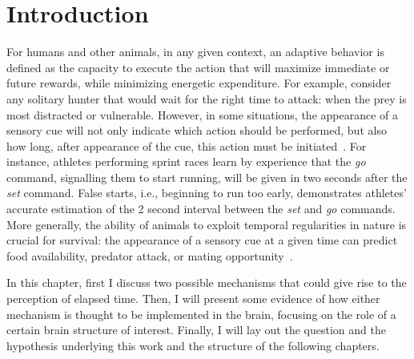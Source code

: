 \chapter{Introduction}
\label{ch:intro:intro}

For humans and other animals, in any given context, an adaptive behavior is defined as the capacity to execute the action that will maximize immediate or future rewards, while minimizing energetic expenditure.
For example, consider any solitary hunter that would wait for the right time to attack: 
    when the prey is most distracted or vulnerable.
However, in some situations, the appearance of a sensory cue will not only indicate which action should be performed, but also how long, after appearance of the cue, this action must be initiated~\cite{Balsam2009Map, Nobre2018NatRevNeurosci}.
For instance, athletes performing sprint races learn by experience that the \textit{go} command, signalling them to start running, will be given in two seconds after the \textit{set} command.
False starts, i.e., beginning to run too early, demonstrates athletes' accurate estimation of the 2 second interval between the \textit{set} and \textit{go} commands.
More generally, the ability of animals to exploit temporal regularities in nature is crucial for survival:
    the appearance of a sensory cue at a given time can predict food availability, predator attack, or mating opportunity~\cite{Kacelnik2002,Gallistel1990book}.
\par
In this chapter, first I discuss two possible mechanisms that could give rise to the perception of elapsed time.
Then, I will present some evidence of how either mechanism is thought to be implemented in the brain, focusing on the role of a certain brain structure of interest.
Finally, I will lay out the question and the hypothesis underlying this work and the structure of the following chapters.




